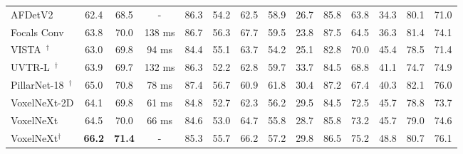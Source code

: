 \documentclass[10pt,twocolumn,letterpaper]{article}
\begin{document}
\begin{table*}[t]
\begin{center}
{\begin{tabular}{|l|ccc|cccccccccc|}
AFDetV2~\cite{afdetv2}  & 62.4 & 68.5 &  - & 86.3 & 54.2 & 62.5 & 58.9 & 26.7 & 85.8 & 63.8 & 34.3 & 80.1 & 71.0 \\ 
Focals Conv~\cite{focal-sparse-conv}  & 63.8 & 70.0 &  138 ms  & 86.7 & 56.3 & 67.7 & 59.5 & 23.8 & 87.5 & 64.5 & 36.3 & 81.4 & 74.1 \\ 
VISTA~\cite{vista}$^{\dagger}$  & 63.0 & 69.8  & 94 ms & 84.4 & 55.1 & 63.7 & 54.2 & 25.1 & 82.8 & 70.0 & 45.4 & 78.5 & 71.4 \\ 
UVTR-L~\cite{uvtr}$^{\dagger}$  & 63.9 & 69.7 &  132 ms &  86.3 & 52.2 & 62.8 & 59.7 & 33.7 & 84.5 & 68.8 & 41.1 & 74.7 & 74.9 \\ 
PillarNet-18~\cite{pillarnet}$^{\dagger}$  & 65.0 & 70.8 & 78 ms  & 87.4 & 56.7 & 60.9 & 61.8 & 30.4 & 87.2 & 67.4 & 40.3 & 82.1 & 76.0 \\ 
\hline \hline
VoxelNeXt-2D  & 64.1 & 69.8 & 61 ms &  84.8 & 52.7 & 62.3 & 56.2 & 29.5 & 84.5 & 72.5 & 45.7 & 78.8 & 73.7 \\ 
VoxelNeXt  & 64.5 & 70.0  & 66 ms & 84.6 & 53.0 & 64.7 & 55.8 & 28.7 & 85.8 & 73.2 & 45.7 & 79.0 & 74.6 \\ 
VoxelNeXt$^{\dagger}$  & \textbf{66.2} & \textbf{71.4} & - & 85.3 & 55.7 & 66.2 & 57.2 & 29.8 & 86.5 & 75.2 & 48.8 & 80.7 & 76.1 \\ 
\hline
\end{tabular}}
\label{tab:nuscenes-test}
\end{center}
\end{table*}
\begin{table}[t]
\begin{center}
\caption{Performance of nuScenes 3D tracking test split for LIDAR-only methods, without multi-modal extension. $^{\dagger}$ is based on the double-flip 3D object detection results in Tab.~\ref{tab:nuscenes-test}.}
\label{tab:nuscenee-tracking-test}
\end{center}
\end{table}
\end{document}
